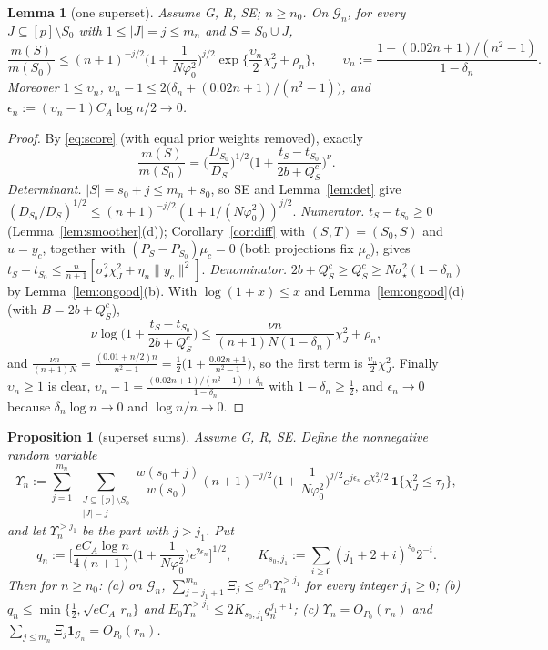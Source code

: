 \documentclass[11pt]{article}
\newtheorem{lemma}[theorem]{Lemma}
\newtheorem{proposition}[theorem]{Proposition}
\theoremstyle{definition}
\newcommand{\Pp}{P_0}
\newcommand{\E}{E_0}
\newcommand{\1}{\mathbf 1}
\newcommand{\Gn}{\mathcal G_n}
\newcommand{\sst}{\sigma_\star^2}
\newcommand{\vp}{\varphi_0^2}
\begin{document}
\begin{lemma}[one superset]\label{lem:onesup}
Assume G, R, SE; $n\ge n_0$. On $\Gn$, for every $J\subseteq[p]\setminus S_0$ with $1\le|J|=j\le m_n$ and $S=S_0\cup J$,
\[
\frac{m(S)}{m(S_0)}\le(n+1)^{-j/2}\Big(1+\frac1{N\vp}\Big)^{j/2}\exp\Big\{\frac{\upsilon_n}2\chi^2_J+\rho_n\Big\},\qquad
\upsilon_n:=\frac{1+(0.02n+1)/(n^2-1)}{1-\delta_n}.
\]
Moreover $1\le\upsilon_n$, $\upsilon_n-1\le2\big(\delta_n+(0.02n+1)/(n^2-1)\big)$, and $\epsilon_n:=(\upsilon_n-1)C_A\log n/2\to0$.
\end{lemma}

\begin{proof}
By \eqref{eq:score} (with equal prior weights removed), exactly
\[
\frac{m(S)}{m(S_0)}=\Big(\frac{D_{S_0}}{D_S}\Big)^{1/2}\Big(1+\frac{t_S-t_{S_0}}{2b+Q^c_S}\Big)^{\nu}.
\]
\emph{Determinant.} $|S|=s_0+j\le m_n+s_0$, so SE and Lemma~\ref{lem:det} give $(D_{S_0}/D_S)^{1/2}\le(n+1)^{-j/2}(1+1/(N\vp))^{j/2}$.
\emph{Numerator.} $t_S-t_{S_0}\ge0$ (Lemma~\ref{lem:smoother}(d)); Corollary~\ref{cor:diff} with $(S,T)=(S_0,S)$ and $u=y_c$, together with $(P_S-P_{S_0})\mu_c=0$ (both projections fix $\mu_c$), gives $t_S-t_{S_0}\le\frac n{n+1}[\sst\chi^2_J+\eta_n\|y_c\|^2]$.
\emph{Denominator.} $2b+Q^c_S\ge Q^c_S\ge N\sst(1-\delta_n)$ by Lemma~\ref{lem:ongood}(b).
With $\log(1+x)\le x$ and Lemma~\ref{lem:ongood}(d) (with $B=2b+Q^c_S$),
\[
\nu\log\Big(1+\frac{t_S-t_{S_0}}{2b+Q^c_S}\Big)\le\frac{\nu n}{(n+1)N(1-\delta_n)}\chi^2_J+\rho_n ,
\]
and $\frac{\nu n}{(n+1)N}=\frac{(0.01+n/2)n}{n^2-1}=\frac12\big(1+\frac{0.02n+1}{n^2-1}\big)$, so the first term is $\frac{\upsilon_n}2\chi^2_J$. Finally $\upsilon_n\ge1$ is clear, $\upsilon_n-1=\frac{(0.02n+1)/(n^2-1)+\delta_n}{1-\delta_n}$ with $1-\delta_n\ge\frac12$, and $\epsilon_n\to0$ because $\delta_n\log n\to0$ and $\log n/n\to0$.
\end{proof}

\begin{proposition}[superset sums]\label{prop:sup}
Assume G, R, SE. Define the nonnegative random variable
\[
\Upsilon_n:=\sum_{j=1}^{m_n}\ \sum_{\substack{J\subseteq[p]\setminus S_0\\|J|=j}}\frac{w(s_0+j)}{w(s_0)}(n+1)^{-j/2}\Big(1+\frac1{N\vp}\Big)^{j/2}e^{j\epsilon_n}\,e^{\chi^2_J/2}\,\1\{\chi^2_J\le\tau_j\},
\]
and let $\Upsilon_n^{>j_1}$ be the part with $j>j_1$. Put
\[
q_n:=\Big[\frac{eC_A\log n}{4(n+1)}\Big(1+\frac1{N\vp}\Big)e^{2\epsilon_n}\Big]^{1/2},\qquad K_{s_0,j_1}:=\sum_{i\ge0}(j_1+2+i)^{s_0}2^{-i}.
\]
Then for $n\ge n_0$: (a) on $\Gn$, $\sum_{j=j_1+1}^{m_n}\Xi_j\le e^{\rho_n}\Upsilon_n^{>j_1}$ for every integer $j_1\ge0$; (b) $q_n\le\min\{\frac12,\sqrt{eC_A}\,r_n\}$ and $\E \Upsilon_n^{>j_1}\le2K_{s_0,j_1}q_n^{j_1+1}$; (c) $\Upsilon_n=O_{\Pp}(r_n)$ and $\sum_{j\le m_n}\Xi_j\1_{\Gn}=O_{\Pp}(r_n)$.
\end{proposition}
\end{document}
